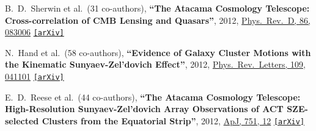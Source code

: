 \documentclass{article}
\def\apj{ApJ}
\def\prd{Phys.\ Rev.\ D}
\def\prl{Phys.\ Rev.\ Letters}
\newcommand{\etal}[1]{et al.\ (#1 co-authors),}
\newcommand{\paper}[1]{\textbf{``#1''}}
\newcommand{\arxiv}[1]
    {\href{https://arxiv.org/abs/#1}{\texttt{\color{magenta}[arXiv]}}}
\begin{document}
\begin{etaremune}
\item
B.~D.~Sherwin \etal{31}
\paper{The Atacama Cosmology Telescope: Cross-correlation of CMB Lensing and Quasars},
2012, \href{http://adsabs.harvard.edu/abs/2012PhRvD..86h3006S}{\prd, 86, 083006}
\arxiv{1207.4543}

\item
N.~Hand \etal{58}
\paper{Evidence of Galaxy Cluster Motions with the Kinematic Sunyaev-Zel'dovich Effect}, 
2012, \href{http://adsabs.harvard.edu/abs/2012PhRvL.109d1101H}{\prl, 109, 041101}
\arxiv{1203.4219}

\item
E.~D.~Reese \etal{44}
\paper{The Atacama Cosmology Telescope: High-Resolution Sunyaev-Zel'dovich Array Observations of ACT SZE-selected Clusters from the Equatorial Strip}, 
2012, \href{http://adsabs.harvard.edu/abs/2012ApJ...751...12R}{\apj, 751, 12}
\arxiv{1108.3343}


\end{etaremune}
\end{document}
